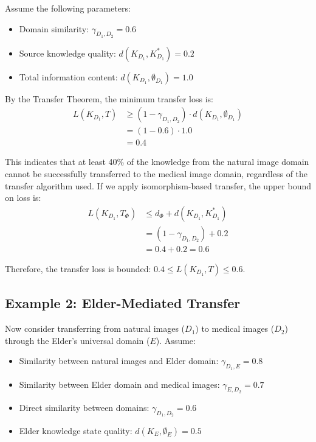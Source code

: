 Assume the following parameters:
\begin{itemize}
    \item Domain similarity: $\gamma_{D_1,D_2} = 0.6$
    \item Source knowledge quality: $d(K_{D_1}, K_{D_1}^*) = 0.2$
    \item Total information content: $d(K_{D_1}, \emptyset_{D_1}) = 1.0$
\end{itemize}

By the Transfer Theorem, the minimum transfer loss is:
\begin{align}
L(K_{D_1}, T) &\geq (1 - \gamma_{D_1,D_2}) \cdot d(K_{D_1}, \emptyset_{D_1})\\
&= (1 - 0.6) \cdot 1.0\\
&= 0.4
\end{align}

This indicates that at least 40\% of the knowledge from the natural image domain cannot be successfully transferred to the medical image domain, regardless of the transfer algorithm used. If we apply isomorphism-based transfer, the upper bound on loss is:
\begin{align}
L(K_{D_1}, T_{\Phi}) &\leq d_{\Phi} + d(K_{D_1}, K_{D_1}^*)\\
&= (1 - \gamma_{D_1,D_2}) + 0.2\\
&= 0.4 + 0.2 = 0.6
\end{align}

Therefore, the transfer loss is bounded: $0.4 \leq L(K_{D_1}, T) \leq 0.6$.

\subsection{Example 2: Elder-Mediated Transfer}

Now consider transferring from natural images ($D_1$) to medical images ($D_2$) through the Elder's universal domain ($E$). Assume:
\begin{itemize}
    \item Similarity between natural images and Elder domain: $\gamma_{D_1,E} = 0.8$
    \item Similarity between Elder domain and medical images: $\gamma_{E,D_2} = 0.7$
    \item Direct similarity between domains: $\gamma_{D_1,D_2} = 0.6$
    \item Elder knowledge state quality: $d(K_E, \emptyset_E) = 0.5$
\end{itemize}


